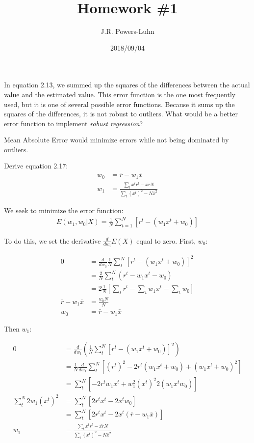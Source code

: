 \documentclass{hw}
\author{J.R. Powers-Luhn}
\date{2018/09/04}
\title{Homework \#1}
\newcommand{\mean}{\bar}
\begin{document}

    In equation 2.13, we summed up the squares of the differences between the actual value and the estimated value. This error function is the one most frequently used, but it is one of several possible error functions. Because it sums up the squares of the differences, it is not robust to outliers. What would be a better error function to implement \textit{robust regression}?

\solution
    Mean Absolute Error would minimize errors while not being dominated by outliers.

    Derive equation 2.17: 
    \begin{align*}
        w_0 &= \mean{r} - w_1 \mean{x} \\
        w_1 &= \frac{\sum_t x^t r^t - \mean{x r} N}{\sum_t \left( x^t \right)^2 - N \mean{x}^2}
    \end{align*}

\solution
    We seek to minimize the error function:
    \begin{align*}
        E(w_1, w_0 | X) = \frac{1}{N} \sum_{t=1}^N \left[ r^t - \left( w_1 x^t + w_0 \right) \right]
    \end{align*}

    To do this, we set the derivative $\frac{d}{dw_i} E(X)$ equal to zero. First, $w_0$:

    \begin{align*}
        0 &= \frac{d}{d w_0} \frac{1}{N} \sum_t^N \left[ r^t - \left( w_1 x^t + w_0 \right) \right]^2 \\
        &= \frac{2}{N} \sum_t^N \left( r^t - w_1 x^t - w_0 \right) \\
        &= 2 \frac{1}{N} \left[ \sum_t r^t - \sum_t w_1 x^t - \sum_t w_0 \right] \\
        \bar{r} - w_1 \bar{x} &= \frac{w_0 N}{N} \\
        w_0 &= \bar{r} - w_1 \bar{x}
    \end{align*}

    Then $w_1$:

    \begin{align*}
        0 &= \frac{d}{d w_1} \left( \frac{1}{N} \sum_t^N \left[ r^t - \left( w_1 x^t + w_0 \right) \right]^2 \right) \\
        &= \frac{1}{N} \frac{d}{dw_1} \sum^N_t \left[ (r^t)^2 - 2 r^t (w_1 x^t + w_0) + (w_1x^t + w_0)^2  \right] \\
        &= \sum_t^N \left[ -2 r^t w_1 x^t + w_1^2 (x^t)^2 2(w_1 x^t w_0) \right] \\
        \sum_t^N 2 w_1 (x^t)^2 &= \sum_t^N \left[ 2 r^t x^t - 2 x^t w_0 \right] \\
        &= \sum_t^N \left[ 2 r^t x^t - 2 x^t (\bar{r} - w_1 \bar{x}) \right] \\
        w_1 &= \frac{\sum_t x^t r^t - \mean{x r} N}{\sum_t \left( x^t \right)^2 - N \mean{x}^2}
    \end{align*}
\end{document}
